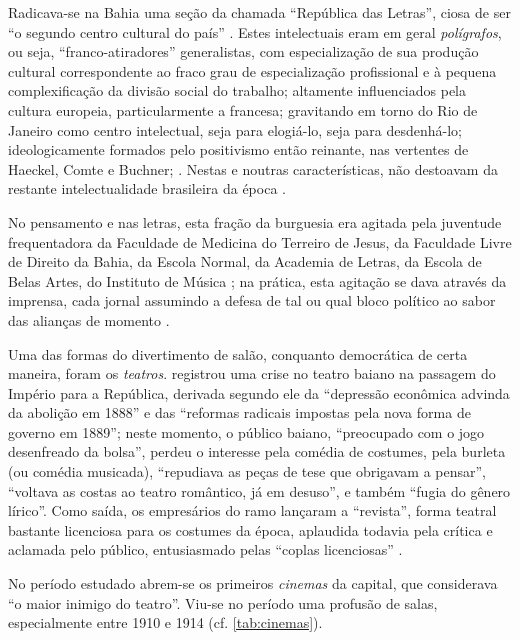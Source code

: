 Radicava-se na Bahia uma seção da chamada ``República das Letras'', ciosa de ser ``o segundo centro cultural do país'' \cite[p.~263]{machadoneto_bahiaint_1972}. Estes intelectuais eram em geral \textit{polígrafos}, ou seja, ``franco-atiradores'' generalistas, com especialização de sua produção cultural correspondente ao fraco grau de especialização profissional e à pequena complexificação da divisão social do trabalho; altamente influenciados pela cultura europeia, particularmente a francesa; gravitando em torno do Rio de Janeiro como centro intelectual, seja para elogiá-lo, seja para desdenhá-lo; ideologicamente formados pelo positivismo então reinante, nas vertentes de Haeckel, Comte e Buchner;  \cite{MachadoNeto1966,machadoneto_bahiaint_1972}.  Nestas e noutras características, não destoavam da restante intelectualidade brasileira da época \cite{martins_intelv5_1977,martins_intelv6_1978}.

No pensamento e nas letras, esta fração da burguesia era agitada pela juventude frequentadora da Faculdade de Medicina do Terreiro de Jesus, da Faculdade Livre de Direito da Bahia, da Escola Normal, da Academia de Letras, da Escola de Belas Artes, do Instituto de Música \cite[p.~272]{machadoneto_bahiaint_1972}; na prática, esta agitação se dava através da imprensa, cada jornal assumindo a defesa de tal ou qual bloco político ao sabor das alianças de momento \cite{souza_imprensa_1972,machadoneto_bahiaint_1972}.

Uma das formas do divertimento de salão, conquanto democrática de certa maneira, foram os \textit{teatros}.  registrou uma crise no teatro baiano na passagem do Império para a República, derivada segundo ele da ``depressão econômica advinda da abolição em 1888'' e das ``reformas radicais impostas pela nova forma de governo em 1889''; neste momento, o público baiano, ``preocupado com o jogo desenfreado da bolsa'', perdeu o interesse pela comédia de costumes, pela burleta (ou comédia musicada), ``repudiava as peças de tese que obrigavam a pensar'', ``voltava as costas ao teatro romântico, já em desuso'', e também ``fugia do gênero lírico''. Como saída, os empresários do ramo lançaram a ``revista'', forma teatral bastante licenciosa para os costumes da época, aplaudida todavia pela crítica e aclamada pelo público, entusiasmado pelas ``coplas licenciosas'' \cite[p.~48-49]{ruy_teatro_1959}.

No período estudado abrem-se os primeiros \textit{cinemas} da capital, que  considerava ``o maior inimigo do teatro''. Viu-se no período uma profusão de salas, especialmente entre 1910 e 1914 (cf. \autoref{tab:cinemas}).

